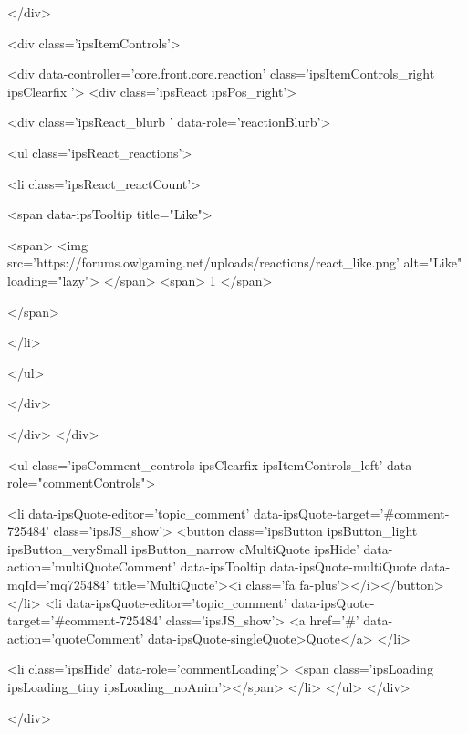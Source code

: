 			
		</div>

		
			<div class='ipsItemControls'>
				
					
						

	<div data-controller='core.front.core.reaction' class='ipsItemControls_right ipsClearfix '>	
		<div class='ipsReact ipsPos_right'>
			
				
				<div class='ipsReact_blurb ' data-role='reactionBlurb'>
					
						

	
	<ul class='ipsReact_reactions'>
		
		
			
				
				<li class='ipsReact_reactCount'>
					
						<span data-ipsTooltip title="Like">
					
							<span>
								<img src='https://forums.owlgaming.net/uploads/reactions/react_like.png' alt="Like" loading="lazy">
							</span>
							<span>
								1
							</span>
					
						</span>
					
				</li>
			
		
	</ul>

					
				</div>
			
			
			
		</div>
	</div>

					
				
				<ul class='ipsComment_controls ipsClearfix ipsItemControls_left' data-role="commentControls">
					
						
							<li data-ipsQuote-editor='topic_comment' data-ipsQuote-target='#comment-725484' class='ipsJS_show'>
								<button class='ipsButton ipsButton_light ipsButton_verySmall ipsButton_narrow cMultiQuote ipsHide' data-action='multiQuoteComment' data-ipsTooltip data-ipsQuote-multiQuote data-mqId='mq725484' title='MultiQuote'><i class='fa fa-plus'></i></button>
							</li>
							<li data-ipsQuote-editor='topic_comment' data-ipsQuote-target='#comment-725484' class='ipsJS_show'>
								<a href='#' data-action='quoteComment' data-ipsQuote-singleQuote>Quote</a>
							</li>
						
						
						
					
					<li class='ipsHide' data-role='commentLoading'>
						<span class='ipsLoading ipsLoading_tiny ipsLoading_noAnim'></span>
					</li>
				</ul>
			</div>
		

		
			

		
	</div>

